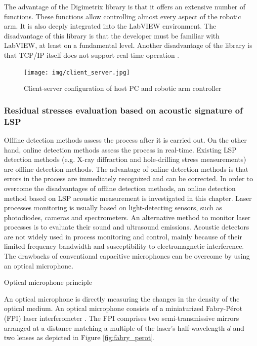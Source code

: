 The advantage of the Digimetrix library is that it offers an extensive number of functions. These functions allow controlling almost every aspect of the robotic arm. It is also deeply integrated into the LabVIEW environment. The disadvantage of this library is that the developer must be familiar with LabVIEW, at least on a fundamental level. Another disadvantage of the library is that TCP/IP itself does not support real-time operation \cite{digimetrix}.

\begin{figure}[h]
    \centering
    \texttt{[image: img/client\_server.jpg]}
    \caption{Client-server configuration of host PC and robotic arm controller \cite{digimetrix}}
    \label{fig:client_server}
\end{figure}

\subsubsection*{Residual stresses evaluation based on acoustic signature of LSP}
\label{sec:optical_microphone}

Offline detection methods assess the process after it is carried out. On the other hand, online detection methods assess the process in real-time. Existing LSP detection methods (e.g. X-ray diffraction and hole-drilling stress measurements) are offline detection methods. The advantage of online detection methods is that errors in the process are immediately recognized and can be corrected. In order to overcome the disadvantages of offline detection methods, an online detection method based on LSP acoustic measurement is investigated in this chapter. Laser processes monitoring is usually based on light-detecting sensors, such as photodiodes, cameras and spectrometers. An alternative method to monitor laser processes is to evaluate their sound and ultrasound emissions. Acoustic detectors are not widely used in process monitoring and control, mainly because of their limited frequency bandwidth and susceptibility to electromagnetic interference. The drawbacks of conventional capacitive microphones can be overcome by using an optical microphone. 

\smallskip
Optical microphone principle

An optical microphone is directly measuring the changes in the density of the optical medium. An optical microphone consists of a miniaturized Fabry-Pérot (FPI) laser interferometer . The FPI comprises two semi-transmissive mirrors arranged at a distance matching a multiple of the laser’s half-wavelength $d$ and two lenses as depicted in Figure \ref{fig:fabry_perot}.


